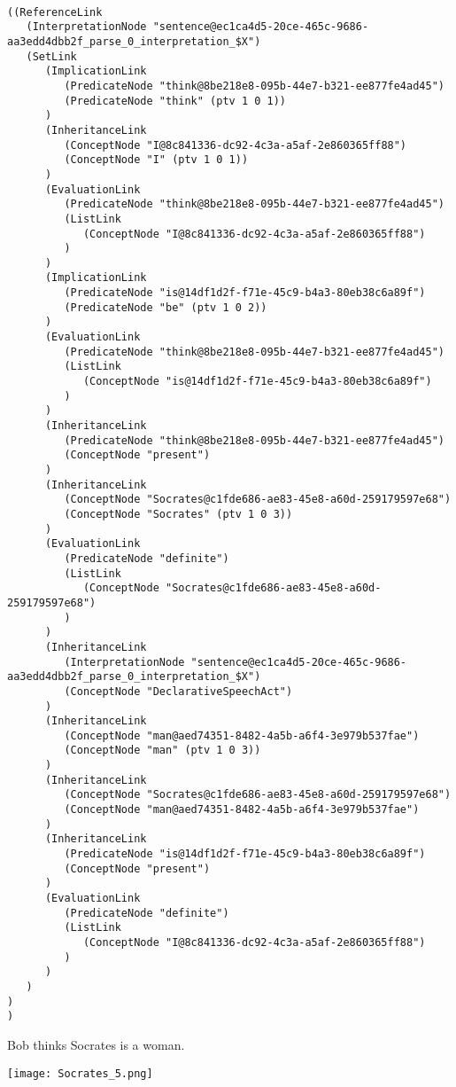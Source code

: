 \begin{verbatim}

((ReferenceLink
   (InterpretationNode "sentence@ec1ca4d5-20ce-465c-9686-aa3edd4dbb2f_parse_0_interpretation_$X")
   (SetLink
      (ImplicationLink
         (PredicateNode "think@8be218e8-095b-44e7-b321-ee877fe4ad45")
         (PredicateNode "think" (ptv 1 0 1))
      )
      (InheritanceLink
         (ConceptNode "I@8c841336-dc92-4c3a-a5af-2e860365ff88")
         (ConceptNode "I" (ptv 1 0 1))
      )
      (EvaluationLink
         (PredicateNode "think@8be218e8-095b-44e7-b321-ee877fe4ad45")
         (ListLink
            (ConceptNode "I@8c841336-dc92-4c3a-a5af-2e860365ff88")
         )
      )
      (ImplicationLink
         (PredicateNode "is@14df1d2f-f71e-45c9-b4a3-80eb38c6a89f")
         (PredicateNode "be" (ptv 1 0 2))
      )
      (EvaluationLink
         (PredicateNode "think@8be218e8-095b-44e7-b321-ee877fe4ad45")
         (ListLink
            (ConceptNode "is@14df1d2f-f71e-45c9-b4a3-80eb38c6a89f")
         )
      )
      (InheritanceLink
         (PredicateNode "think@8be218e8-095b-44e7-b321-ee877fe4ad45")
         (ConceptNode "present")
      )
      (InheritanceLink
         (ConceptNode "Socrates@c1fde686-ae83-45e8-a60d-259179597e68")
         (ConceptNode "Socrates" (ptv 1 0 3))
      )
      (EvaluationLink
         (PredicateNode "definite")
         (ListLink
            (ConceptNode "Socrates@c1fde686-ae83-45e8-a60d-259179597e68")
         )
      )
      (InheritanceLink
         (InterpretationNode "sentence@ec1ca4d5-20ce-465c-9686-aa3edd4dbb2f_parse_0_interpretation_$X")
         (ConceptNode "DeclarativeSpeechAct")
      )
      (InheritanceLink
         (ConceptNode "man@aed74351-8482-4a5b-a6f4-3e979b537fae")
         (ConceptNode "man" (ptv 1 0 3))
      )
      (InheritanceLink
         (ConceptNode "Socrates@c1fde686-ae83-45e8-a60d-259179597e68")
         (ConceptNode "man@aed74351-8482-4a5b-a6f4-3e979b537fae")
      )
      (InheritanceLink
         (PredicateNode "is@14df1d2f-f71e-45c9-b4a3-80eb38c6a89f")
         (ConceptNode "present")
      )
      (EvaluationLink
         (PredicateNode "definite")
         (ListLink
            (ConceptNode "I@8c841336-dc92-4c3a-a5af-2e860365ff88")
         )
      )
   )
)
)
\end{verbatim}


  Bob thinks Socrates is a woman.

\texttt{[image: Socrates\_5.png]}

